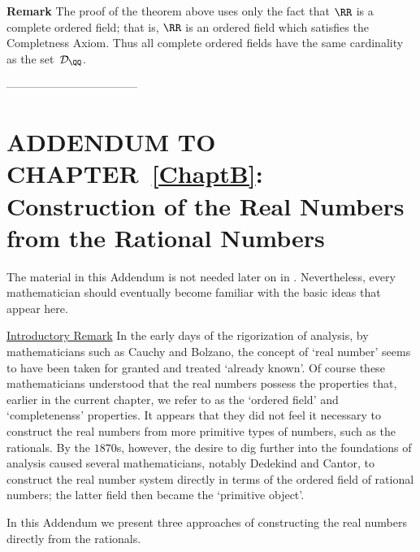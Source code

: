 {{\V

        {\bf Remark} The proof of the theorem above uses only the fact that ${\RR}$ is a complete ordered field;
    that is, ${\RR}$ is an ordered field which satisfies the Completness Axiom. Thus all complete ordered fields have the same cardinality as the set~${\cal D}_{{\QQ}}$. 
}%
-----------------------------------

\V

                        \section{ADDENDUM TO CHAPTER~\ref{ChaptB}: Construction of the Real Numbers from the Rational Numbers}
                        \label{SectBAdd}



\V
\V

        The material in this Addendum is not needed later on in {\TheseNotes}. Nevertheless,
    every mathematician should eventually become familiar with the basic ideas that appear here.

\VV

        \underline{Introductory Remark} In the early days of the rigorization of analysis, by mathematicians such as Cauchy and Bolzano,
    the concept of `real number' seems to have been taken for granted and treated `already known'.
    Of course these mathematicians understood that the real numbers possess the properties that,
    earlier in the current chapter, we refer to as the `ordered field' and `completenenss' properties.
    It appears that they did not feel it necessary to construct the real numbers from more primitive types of numbers, such as the rationals.
    By the $1870$s, however, the desire to dig further into the foundations of analysis caused several mathematicians, notably Dedekind and Cantor,
    to construct the real number system directly in terms of the ordered field of rational numbers; the latter field then became the `primitive object'.

        In this Addendum we present three approaches of constructing the real numbers directly from the rationals.

}
